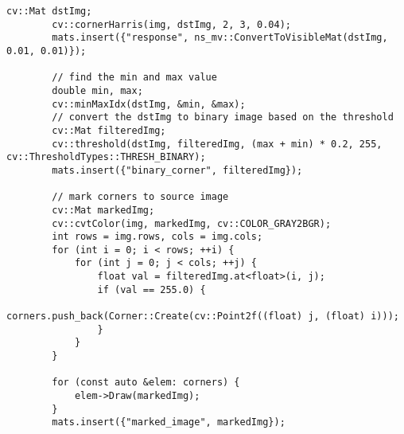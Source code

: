 \documentclass[12pt, onecolumn]{article}
\newcommand\normf{\fangsong}
\begin{document}
	\begin{lstlisting}[caption={\normf Harris角点检测代码}]
	    cv::Mat dstImg;
	    cv::cornerHarris(img, dstImg, 2, 3, 0.04);
	    mats.insert({"response", ns_mv::ConvertToVisibleMat(dstImg, 0.01, 0.01)});
	
	    // find the min and max value
	    double min, max;
	    cv::minMaxIdx(dstImg, &min, &max);
	    // convert the dstImg to binary image based on the threshold
	    cv::Mat filteredImg;
	    cv::threshold(dstImg, filteredImg, (max + min) * 0.2, 255, cv::ThresholdTypes::THRESH_BINARY);
	    mats.insert({"binary_corner", filteredImg});
	
	    // mark corners to source image
	    cv::Mat markedImg;
	    cv::cvtColor(img, markedImg, cv::COLOR_GRAY2BGR);
	    int rows = img.rows, cols = img.cols;
	    for (int i = 0; i < rows; ++i) {
	        for (int j = 0; j < cols; ++j) {
	            float val = filteredImg.at<float>(i, j);
	            if (val == 255.0) {
	                corners.push_back(Corner::Create(cv::Point2f((float) j, (float) i)));
	            }
	        }
	    }
	
	    for (const auto &elem: corners) {
	        elem->Draw(markedImg);
	    }
	    mats.insert({"marked_image", markedImg});
	\end{lstlisting}
	
\end{document}
